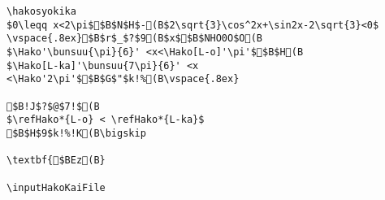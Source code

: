 \begin{verbatim}
\hakosyokika
$0\leqq x<2\pi$$B$N$H$-(B$2\sqrt{3}\cos^2x+\sin2x-2\sqrt{3}<0$
\vspace{.8ex}$B$r$_$?$9(B$x$$B$NHO0O$O(B
$\Hako'\bunsuu{\pi}{6}' <x<\Hako[L-o]'\pi'$$B$H(B
$\Hako[L-ka]'\bunsuu{7\pi}{6}' <x
<\Hako'2\pi'$$B$G$"$k!%(B\vspace{.8ex}

$B!J$?$@$7!$(B
$\refHako*{L-o} < \refHako*{L-ka}$ 
$B$H$9$k!%!K(B\bigskip

\textbf{$BEz(B}

\inputHakoKaiFile
\end{verbatim}
